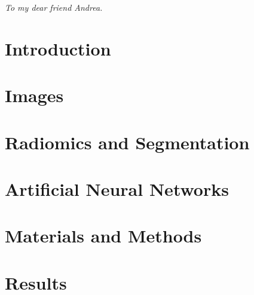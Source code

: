 \documentclass[12pt,a4paper]{report}
\begin{document}
\begin{titlepage}

\end{titlepage}


\clearpage{\pagestyle{empty}}

\chapter*{}
\begin{midpage}
\begin{flushright}
\textit{To my dear friend Andrea.}
\end{flushright}
\end{midpage}



\newpage

\tableofcontents               
{}


\clearpage{\pagestyle{empty}}
\chapter*{Introduction}



\chapter{Images}\label{chap:images}


\newpage

\chapter{Radiomics and Segmentation}\label{chap:segmentation}




\chapter{Artificial Neural Networks}\label{chap:ann}


\chapter{Materials and Methods}\label{chap:methods}


\chapter{Results}\label{chap:results}

\end{document}
